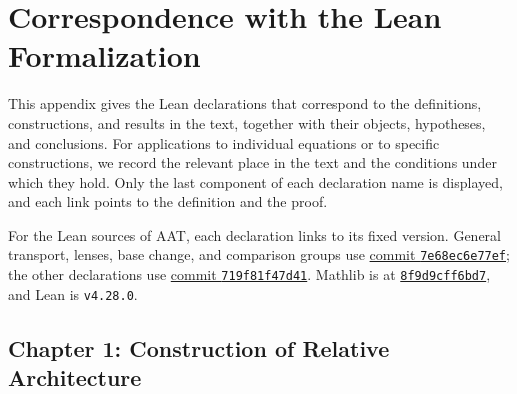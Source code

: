 \chapter{Correspondence with the Lean Formalization}\label{app:A}

This appendix gives the Lean declarations that correspond to the definitions, constructions, and results in the text, together with their objects, hypotheses, and conclusions.
For applications to individual equations or to specific constructions, we record the relevant place in the text and the conditions under which they hold.
Only the last component of each declaration name is displayed, and each link points to the definition and the proof.

For the Lean sources of AAT, each declaration links to its fixed version.
General transport, lenses, base change, and comparison groups use \href{https://github.com/iroha1203/AlgebraicArchitectureTheoryV2/tree/7e68ec6e77ef0249ede6a4c875715cfaf1cb3ee6}{commit \texttt{7e68ec6e77ef}}; the other declarations use \href{https://github.com/iroha1203/AlgebraicArchitectureTheoryV2/tree/719f81f47d410701fd82c2bc88613cc140c59377}{commit \texttt{719f81f47d41}}.
Mathlib is at \href{https://github.com/leanprover-community/mathlib4/tree/8f9d9cff6bd728b17a24e163c9402775d9e6a365}{\texttt{8f9d9cff6bd7}}, and Lean is \texttt{v4.28.0}.

\section{Chapter 1: Construction of Relative Architecture}\label{sec:A.1}

